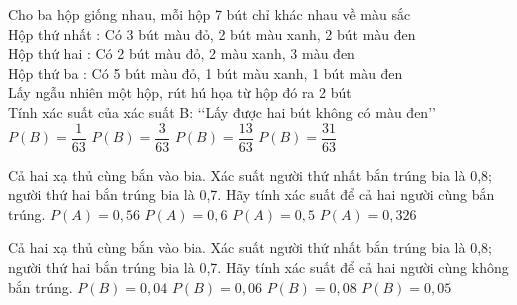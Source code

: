 \begin{ex}
Cho ba hộp giống nhau, mỗi hộp 7 bút chỉ khác nhau về màu sắc\\
Hộp thứ nhất : Có 3 bút màu đỏ, 2 bút màu xanh, 2 bút màu đen\\
Hộp thứ hai : Có 2 bút màu đỏ, 2 màu xanh, 3 màu đen\\
Hộp thứ ba : Có 5 bút màu đỏ, 1 bút màu xanh, 1 bút màu đen\\
Lấy ngẫu nhiên một hộp, rút hú họa từ hộp đó ra 2 bút\\
Tính xác suất của xác suất B: \lq\lq Lấy được hai bút không có màu đen\rq\rq 
\choice
{$P(B)=\dfrac{1}{63}$}
{$P(B)=\dfrac{3}{63}$}
{$P(B)=\dfrac{13}{63}$}
{\True $P(B)=\dfrac{31}{63}$}
\end{ex}
\begin{ex}
Cả hai xạ thủ cùng bắn vào bia. Xác suất người thứ nhất bắn trúng bia là 0{,}8; người thứ hai bắn trúng bia là 0{,}7. Hãy tính xác suất để cả hai người cùng bắn trúng.
\choice
{\True $P(A)=0{,}56$}
{$P(A)=0{,}6$}
{$P(A)=0{,}5$}
{$P(A)=0{,}326$}
\end{ex}
\begin{ex}
Cả hai xạ thủ cùng bắn vào bia. Xác suất người thứ nhất bắn trúng bia là 0{,}8; người thứ hai bắn trúng bia là 0{,}7. Hãy tính xác suất để cả hai người cùng không bắn trúng.
\choice
{$P(B)=0{,}04$}
{\True $P(B)=0{,}06$}
{$P(B)=0{,}08$}
{$P(B)=0{,}05$}
\end{ex}
